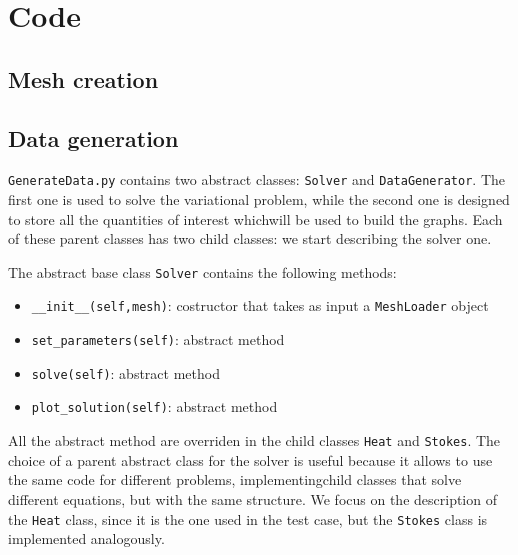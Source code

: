 \documentclass[11pt,a4paper]{article}
\begin{document}
\section{Code}


\subsection{Mesh creation}

\subsection{Data generation}

\texttt{GenerateData.py} contains two abstract classes: \texttt{Solver} and \texttt{DataGenerator}. The first one is used to solve the variational problem, while the second one is designed to store all the quantities of interest whichwill be used to build the graphs. Each of these parent classes has two child classes: we start describing the solver one. 

The abstract base class \texttt{Solver} contains the following methods:
\begin{itemize}
    \item \texttt{\_\_init\_\_(self,mesh)}: costructor that takes as input a \texttt{MeshLoader} object 
    \item \texttt{set\_parameters(self)}: abstract method
    \item \texttt{solve(self)}: abstract method
    \item \texttt{plot\_solution(self)}: abstract method
\end{itemize}

All the abstract method are overriden in the child classes \texttt{Heat} and \texttt{Stokes}. The choice of a parent abstract class for the solver is useful because it allows to use the same code for different problems, implementingchild classes that solve different equations, but with the same structure. 
We focus on the description of the \texttt{Heat} class, since it is the one used in the test case, but the \texttt{Stokes} class is implemented analogously.
\end{document}

